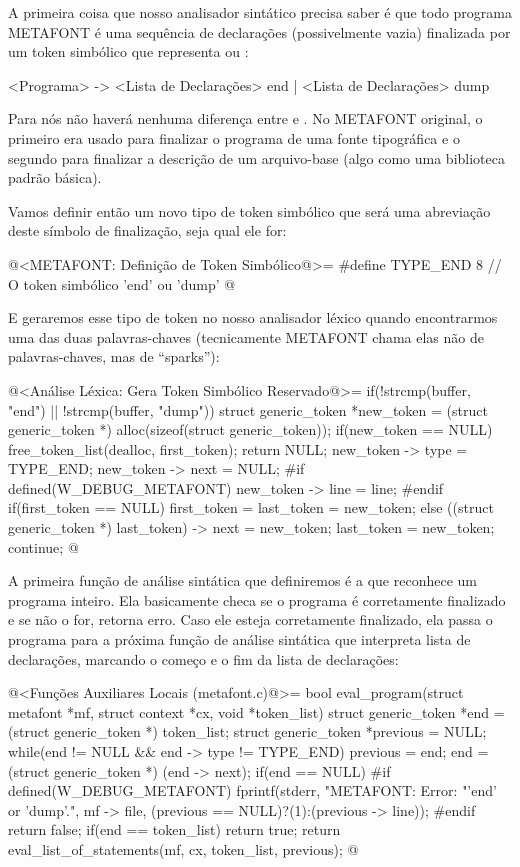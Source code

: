 A primeira coisa que nosso analisador sintático precisa saber é que
todo programa METAFONT é uma sequência de declarações (possivelmente
vazia) finalizada por um token simbólico que
representa  ou :

\alinhaverbatim
<Programa> -> <Lista de Declarações> end | <Lista de Declarações> dump
\alinhanormal

Para nós não haverá nenhuma diferença entre 
e . No METAFONT original, o primeiro era usado para
finalizar o programa de uma fonte tipográfica e o segundo para
finalizar a descrição de um arquivo-base (algo como uma biblioteca
padrão básica).

Vamos definir então um novo tipo de token simbólico que será uma
abreviação deste símbolo de finalização, seja qual ele for:

\iniciocodigo
@<METAFONT: Definição de Token Simbólico@>=
#define TYPE_END             8 // O token simbólico 'end' ou 'dump'
@
\fimcodigo

E geraremos esse tipo de token no nosso analisador léxico quando
encontrarmos uma das duas palavras-chaves (tecnicamente METAFONT chama
elas não de palavras-chaves, mas de ``sparks''):

\iniciocodigo
@<Análise Léxica: Gera Token Simbólico Reservado@>=
if(!strcmp(buffer, "end") || !strcmp(buffer, "dump")){
  struct generic_token *new_token =
     (struct generic_token *) alloc(sizeof(struct generic_token));
  if(new_token == NULL){
    free_token_list(dealloc, first_token);
    return NULL;
  }
  new_token -> type = TYPE_END;
  new_token -> next = NULL;
#if defined(W_DEBUG_METAFONT)
  new_token -> line = line;
#endif
  if(first_token == NULL)
    first_token = last_token = new_token;
  else{
    ((struct generic_token *) last_token) -> next = new_token;
    last_token = new_token;
  }
  continue;
}
@
\fimcodigo

A primeira função de análise sintática que definiremos é a que
reconhece um programa inteiro. Ela basicamente checa se o programa é
corretamente finalizado e se não o for, retorna erro. Caso ele esteja
corretamente finalizado, ela passa o programa para a próxima função de
análise sintática que interpreta lista de declarações, marcando o
começo e o fim da lista de declarações:

\iniciocodigo
@<Funções Auxiliares Locais (metafont.c)@>=
bool eval_program(struct metafont *mf, struct context *cx,
                  void *token_list){
  struct generic_token *end = (struct generic_token *) token_list;
  struct generic_token *previous = NULL;
  while(end != NULL && end -> type != TYPE_END){
    previous = end;
    end = (struct generic_token *) (end -> next);
  }
  if(end == NULL){
#if defined(W_DEBUG_METAFONT)
    fprintf(stderr, "METAFONT: Error: %
                    "'end' or 'dump'.\n", mf -> file,
                    (previous == NULL)?(1):(previous -> line));
#endif
    return false;
  }
  if(end == token_list)
    return true;
  return eval_list_of_statements(mf, cx, token_list, previous);
}
@
\fimcodigo

